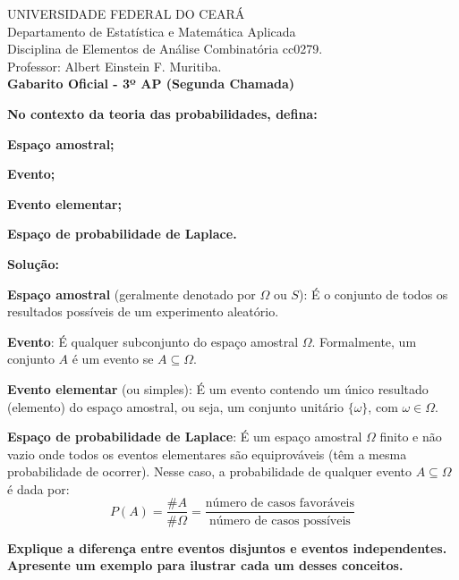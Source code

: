 \documentclass[a4paper,10pt,landscape,twocolumn]{article}  %
\let\oldenumerate\enumerate
\let\oldendenumerate\endenumerate
\renewenvironment{enumerate}{%
  \oldenumerate%
  \setlength{\itemsep}{1pt}%
  \setlength{\parskip}{0pt}%
  \setlength{\parsep}{0pt}%
  \setlength{\topsep}{2pt}%
  \setlength{\partopsep}{0pt}%
}{%
  \oldendenumerate%
}
\begin{document}
\footnotesize
\thispagestyle{empty}

UNIVERSIDADE FEDERAL DO CEARÁ\\
Departamento de Estatística e Matemática Aplicada\\
Disciplina de Elementos de Análise Combinatória cc0279.\\
Professor: Albert Einstein F. Muritiba.\\
\textbf{Gabarito Oficial - 3º AP (Segunda Chamada)} \\[0.2cm]

\begin{enumerate}
    
    \item \textbf{No contexto da teoria das probabilidades, defina:}
    \begin{enumerate}
        \item \textbf{Espaço amostral;}
        \item \textbf{Evento;}
        \item \textbf{Evento elementar;}
        \item \textbf{Espaço de probabilidade de Laplace.}
    \end{enumerate}
    
    \textbf{Solução:}
    \begin{enumerate}
        \item \textbf{Espaço amostral} (geralmente denotado por $\Omega$ ou $S$): É o conjunto de todos os resultados possíveis de um experimento aleatório.
        \item \textbf{Evento}: É qualquer subconjunto do espaço amostral $\Omega$. Formalmente, um conjunto $A$ é um evento se $A \subseteq \Omega$.
        \item \textbf{Evento elementar} (ou simples): É um evento contendo um único resultado (elemento) do espaço amostral, ou seja, um conjunto unitário $\{\omega\}$, com $\omega \in \Omega$.
        \item \textbf{Espaço de probabilidade de Laplace}: É um espaço amostral $\Omega$ finito e não vazio onde todos os eventos elementares são equiprováveis (têm a mesma probabilidade de ocorrer). Nesse caso, a probabilidade de qualquer evento $A \subseteq \Omega$ é dada por:
        \[ P(A) = \frac{\# A}{\# \Omega} = \frac{\text{número de casos favoráveis}}{\text{número de casos possíveis}} \]
    \end{enumerate}
    
    \item \textbf{Explique a diferença entre eventos disjuntos e eventos independentes. Apresente um exemplo para ilustrar cada um desses conceitos.}
    

\end{enumerate}
\end{document}
